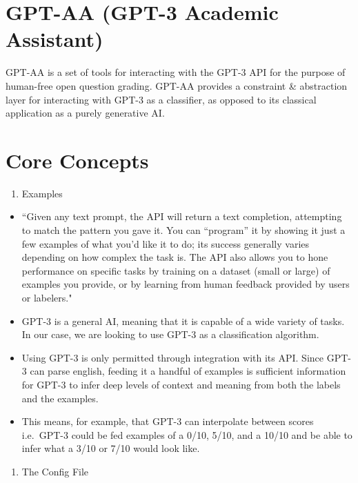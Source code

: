 \documentclass[
]{article}
\author{}
\date{}
\providecommand{\tightlist}{%
  \setlength{\itemsep}{0pt}\setlength{\parskip}{0pt}}
\begin{document}
\hypertarget{gpt-aa-gpt-3-academic-assistant}{%
\section{GPT-AA (GPT-3 Academic
Assistant)}\label{gpt-aa-gpt-3-academic-assistant}}

GPT-AA is a set of tools for interacting with the GPT-3 API for the
purpose of human-free open question grading. GPT-AA provides a
constraint \& abstraction layer for interacting with GPT-3 as a
classifier, as opposed to its classical application as a purely
generative AI.

\hypertarget{core-concepts}{%
\section{Core Concepts}\label{core-concepts}}

\begin{enumerate}
\def\labelenumi{\arabic{enumi}.}
\tightlist
\item
  Examples
\end{enumerate}

\begin{itemize}
\item
  ``Given any text prompt, the API will return a text completion,
  attempting to match the pattern you gave it. You can ``program'' it by
  showing it just a few examples of what you'd like it to do; its
  success generally varies depending on how complex the task is. The API
  also allows you to hone performance on specific tasks by training on a
  dataset (small or large) of examples you provide, or by learning from
  human feedback provided by users or labelers."
\item
  GPT-3 is a general AI, meaning that it is capable of a wide variety of
  tasks. In our case, we are looking to use GPT-3 as a classification
  algorithm.
\item
  Using GPT-3 is only permitted through integration with its API. Since
  GPT-3 can parse english, feeding it a handful of examples is
  sufficient information for GPT-3 to infer deep levels of context and
  meaning from both the labels and the examples.
\item
  This means, for example, that GPT-3 can interpolate between scores
  i.e.~GPT-3 could be fed examples of a 0/10, 5/10, and a 10/10 and be
  able to infer what a 3/10 or 7/10 would look like.
\end{itemize}

\begin{enumerate}
\def\labelenumi{\arabic{enumi}.}
\setcounter{enumi}{1}
\tightlist
\item
  The Config File
\end{enumerate}
\end{document}
